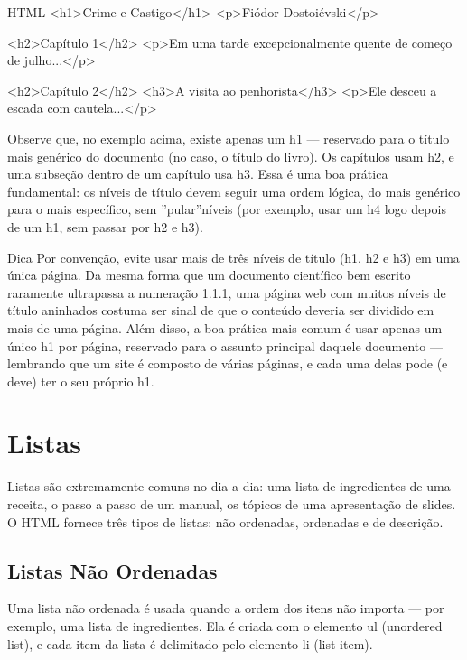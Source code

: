 \begin{codebox}{HTML}
 <h1>Crime e Castigo</h1>
 <p>Fiódor Dostoiévski</p>

 <h2>Capítulo 1</h2>
 <p>Em uma tarde excepcionalmente quente de começo de julho...</p>

 <h2>Capítulo 2</h2>
 <h3>A visita ao penhorista</h3>
 <p>Ele desceu a escada com cautela...</p>
\end{codebox}

Observe que, no exemplo acima, existe apenas um h1 — reservado para o título mais genérico do documento (no caso, o título do livro). Os capítulos usam h2, e uma subseção dentro de um capítulo usa h3. Essa é uma boa prática fundamental: os níveis de título devem seguir uma ordem lógica, do mais genérico para o mais específico, sem ”pular”níveis (por exemplo, usar um h4 logo depois de um h1, sem passar por h2 e h3).

\begin{infobox}{Dica}
Por convenção, evite usar mais de três níveis de título (h1, h2 e h3) em uma única página. Da mesma forma que um documento científico bem escrito raramente ultrapassa a numeração 1.1.1, uma página web com muitos níveis de título aninhados costuma ser sinal de que o conteúdo deveria ser dividido em mais de uma página. Além disso, a boa prática mais comum é usar apenas um único h1 por página, reservado para o assunto principal daquele documento — lembrando que um site é composto de várias páginas, e cada uma delas pode (e deve) ter o seu próprio h1.
\end{infobox}

\section{Listas}

Listas são extremamente comuns no dia a dia: uma lista de ingredientes de uma receita, o passo a passo de um manual, os tópicos de uma apresentação de slides. O HTML fornece três tipos de listas: não ordenadas, ordenadas e de descrição.

\subsection{Listas Não Ordenadas}

Uma lista não ordenada é usada quando a ordem dos itens não importa — por exemplo, uma lista de ingredientes. Ela é criada com o elemento ul (unordered list), e cada item da lista é delimitado pelo elemento li (list item).

